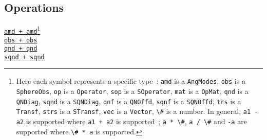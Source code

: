 \documentclass{timesjhep}
\begin{document}
\begin{multicols}{2}
    \subsection*{Operations}
    \noindent
    \href{https://docs.fuzzified.world/models/\#Base.:+-Tuple{AngModes,\%20AngModes}}{\lstinline|amd + amd|}\footnote{Here each symbol represents a specific type~: \lstinline[basicstyle=\ttfamily\scriptsize]|amd| is a \lstinline[basicstyle=\ttfamily\scriptsize]|AngModes|,  \lstinline[basicstyle=\ttfamily\scriptsize]|obs| is a \lstinline[basicstyle=\ttfamily\scriptsize]|SphereObs|, \lstinline[basicstyle=\ttfamily\scriptsize]|op| is a \lstinline[basicstyle=\ttfamily\scriptsize]|Operator|, \lstinline[basicstyle=\ttfamily\scriptsize]|sop| is a \lstinline[basicstyle=\ttfamily\scriptsize]|SOperator|, \lstinline[basicstyle=\ttfamily\scriptsize]|mat| is a \lstinline[basicstyle=\ttfamily\scriptsize]|OpMat|, \lstinline[basicstyle=\ttfamily\scriptsize]|qnd| is a \lstinline[basicstyle=\ttfamily\scriptsize]|QNDiag|, \lstinline[basicstyle=\ttfamily\scriptsize]|sqnd| is a  \lstinline[basicstyle=\ttfamily\scriptsize]|SQNDiag|, \lstinline[basicstyle=\ttfamily\scriptsize]|qnf| is a \lstinline[basicstyle=\ttfamily\scriptsize]|QNOffd|, \lstinline[basicstyle=\ttfamily\scriptsize]|sqnf| is a  \lstinline[basicstyle=\ttfamily\scriptsize]|SQNOffd|, \lstinline[basicstyle=\ttfamily\scriptsize]|trs| is a \lstinline[basicstyle=\ttfamily\scriptsize]|Transf|, \lstinline[basicstyle=\ttfamily\scriptsize]|strs| is a \lstinline[basicstyle=\ttfamily\scriptsize]|STransf|, \lstinline[basicstyle=\ttfamily\scriptsize]|vec| is a \lstinline[basicstyle=\ttfamily\scriptsize]|Vector|, \lstinline[basicstyle=\ttfamily\scriptsize]|\#| is a number. In general, \lstinline[basicstyle=\ttfamily\scriptsize]|a1 - a2| is supported where \lstinline[basicstyle=\ttfamily\scriptsize]|a1 + a2| is supported~; \lstinline[basicstyle=\ttfamily\scriptsize]|a * \#|, \lstinline[basicstyle=\ttfamily\scriptsize]|a / \#| and \lstinline[basicstyle=\ttfamily\scriptsize]|-a| are supported where \lstinline[basicstyle=\ttfamily\scriptsize]|\# * a| is supported.}\\
    \href{https://docs.fuzzified.world/models/\#Base.:+-Tuple{SphereObs,\%20SphereObs}}{\lstinline|obs + obs|}\\
    \href{https://docs.fuzzified.world/core/\#Base.:+-Tuple{QNDiag,\%20QNDiag}}{\lstinline|qnd + qnd|}\\
    \href{https://docs.fuzzified.world/fuzzifino/\#Base.:+-Tuple{SQNDiag,\%20SQNDiag}}{\lstinline|sqnd + sqnd|}\\

\end{multicols}
\end{document}
